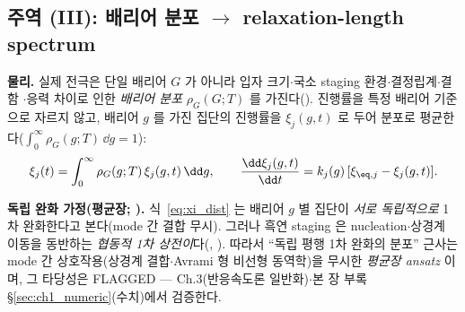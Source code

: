 \subsection{주역 (III): 배리어 분포 $\to$ relaxation-length spectrum}\label{sec:spectrum}
\textbf{물리.} 실제 전극은 단일 배리어 $G$ 가 아니라 입자 크기$\cdot$국소 staging 환경$\cdot$결정립계$\cdot$결함
$\cdot$응력 차이로 인한 \emph{배리어 분포} $\rho_G(G;T)$ 를 가진다(). 진행률을 특정 배리어 기준으로
자르지 않고, 배리어 $g$ 를 가진 집단의 진행률을 $\xi_j(g,t)$ 로 두어 분포로 평균한다($\int_0^\infty
\rho_G(g;T)\,\dd g=1$):
\begin{equation}
\xi_j(t)=\int_0^\infty \rho_G(g;T)\,\xi_j(g,t)\,\dd g,\qquad
\frac{\dd\xi_j(g,t)}{\dd t}=k_j(g)\,[\xi_{\eq,j}-\xi_j(g,t)].
\label{eq:xi_dist}
\end{equation}
\begin{flagbox}
\textbf{독립 완화 가정(평균장; ).} 식~\eqref{eq:xi_dist} 는 배리어 $g$ 별 집단이 \emph{서로 독립적으로}
1차 완화한다고 본다(mode 간 결합 무시). 그러나 흑연 staging 은 nucleation$\cdot$상경계 이동을 동반하는
\emph{협동적 1차 상전이}다(, \cite{funabiki1999ea,funabiki1999jes}). 따라서 ``독립 평행 1차 완화의 분포''
근사는 mode 간 상호작용(상경계 결합$\cdot$Avrami 형 비선형 동역학)을 무시한 \emph{평균장 ansatz} 이며, 그 타당성은
FLAGGED — Ch.3(반응속도론 일반화)$\cdot$본 장 부록 \S\ref{sec:ch1_numeric}(수치)에서 검증한다.
\end{flagbox}

